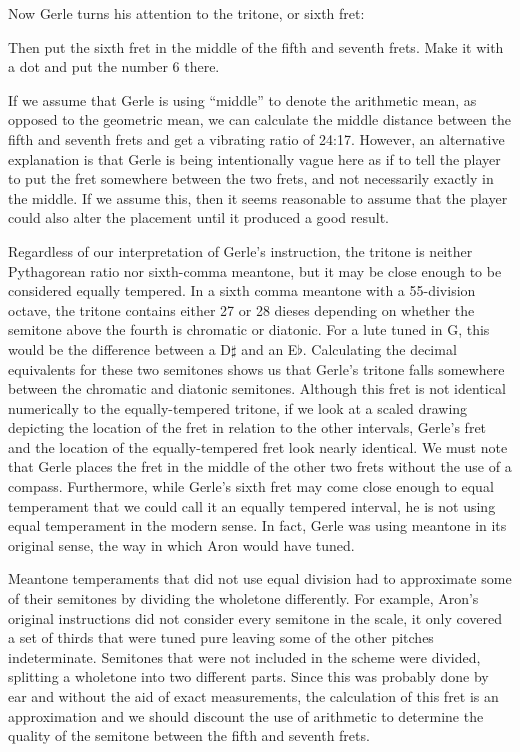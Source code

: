 Now Gerle turns his attention to the tritone, or sixth fret:
\begin{blocks}
Then put the sixth fret in the middle of the fifth and seventh frets.  Make it
with a dot and put the number 6 there.
\end{blocks}
If we assume that Gerle is using ``middle'' to denote the arithmetic mean, as opposed
to the geometric mean, we can calculate the middle distance between the
fifth and seventh frets and get a vibrating ratio of 24:17.  However, an alternative
explanation is that Gerle is being intentionally vague here as if to tell the player to
put the fret somewhere between the two frets, and not necessarily exactly in the
middle.  If we assume this, then it seems reasonable to assume that the player
could also alter the placement until it produced a good result.

Regardless of our interpretation of Gerle's instruction, the tritone is neither
Pythagorean ratio nor sixth-comma meantone, but it may be close enough to be considered
equally tempered. In a sixth comma meantone with a 55-division octave, the tritone
contains either 27 or 28 dieses depending on whether the semitone above the
fourth is chromatic or diatonic.  For a lute tuned in G, this would be the difference
between a D$\sharp$ and an E$\flat$. Calculating the decimal equivalents for these two
semitones shows us that Gerle's tritone falls somewhere between the chromatic and
diatonic semitones.  Although this fret is not identical numerically to the
equally-tempered tritone, if we look at a scaled drawing depicting the location of the
fret in relation to the other intervals, Gerle's fret and the location of the
equally-tempered fret look nearly identical. We must note that Gerle places the fret in
the middle of the other two frets without the use of a compass.  Furthermore, while
Gerle's sixth fret may come close enough to equal temperament that we could call it an
equally tempered interval, he is not using equal temperament in the modern sense.  In
fact, Gerle was using meantone in its original sense, the way in which Aron would have
tuned.

Meantone temperaments that did not use equal division had to approximate some of their
semitones by dividing the wholetone differently. For example, Aron's
original instructions did not consider every semitone in the scale, it only covered a
set of thirds that were tuned pure leaving some of the other pitches indeterminate.
Semitones that were not included in the scheme were divided, splitting a wholetone into
two different parts. Since this was probably done by ear and without the aid of exact
measurements, the calculation of this fret is an approximation and we should discount
the use of arithmetic to determine the quality of the semitone between the fifth and 
seventh frets.

